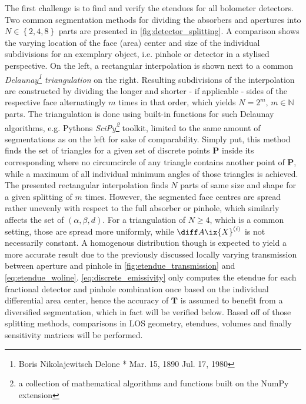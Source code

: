            The first challenge is to find and verify the etendues for all bolometer detectors. Two common segmentation methods for dividing the absorbers and apertures into $N\in\left\{2,4,8\right\}$ parts are presented in \cref{fig:detector_splitting}. A comparison shows the varying location of the face (area) center and size of the individual subdivisions for an exemplary object, i.e. pinhole or detector in a stylised perspective. On the left, a rectangular interpolation is shown next to a common \textit{Delaunay\footnote[1]{Boris Nikolajewitsch Delone * Mar. 15, 1890 \textdagger Jul. 17, 1980} triangulation} on the right. Resulting subdivisions of the interpolation are constructed by dividing the longer and shorter - if applicable - sides of the respective face alternatingly $m$ times in that order, which yields $N=2^{m},\,m\in\mathbb{N}$ parts. The triangulation is done using built-in functions for such Delaunay algorithms, e.g. Pythons \textit{SciPy\footnote[2]{a collection of mathematical algorithms and functions built on the NumPy extension}} toolkit, limited to the same amount of segmentations as on the left for sake of comparability. Simply put, this method finds the set of triangles for a given set of discrete points $\mathbf{P}$ inside its corresponding  where no circumcircle of any triangle contains another point of $\mathbf{P}$, while a maximum of all individual minimum angles of those triangles is achieved. The presented rectangular interpolation finds $N$ parts of same size and shape for a given splitting of $m$ times. However, the segmented face centres are spread rather unevenly with respect to the full absorber or pinhole, which similarly affects the set of $\left(\alpha,\beta,d\right)$. For a triangulation of $N\ge4$, which is a common setting, those are spread more uniformly, while $\diff A\ix{X}^{\left(i\right)}$ is not necessarily constant. A homogenous distribution though is expected to yield a more accurate result due to the previously discussed locally varying transmission between aperture and pinhole in \cref{fig:etendue_transmission} and \cref{eq:etendue_woline}. \cref{eq:discrete_emissivity} only computes the etendue for each fractional detector and pinhole combination once based on the individual differential area center, hence the accuracy of $\mathbf{T}$ is assumed to benefit from a diversified segmentation, which in fact will be verified below. Based off of those splitting methods, comparisons in LOS geometry, etendues, volumes and finally sensitivity matrices will be performed.\\%
